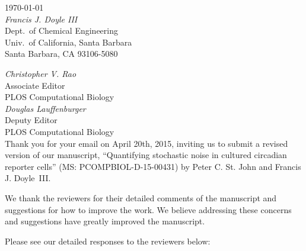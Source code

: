 \documentclass[11pt, letterpaper]{article}
\begin{document}
\begin{flushright}
\today\\[2ex]
{\itshape Francis J. Doyle III}\\
Dept.\ of Chemical Engineering\\
Univ.\ of California, Santa Barbara\\
Santa Barbara, CA 93106-5080\\
\end{flushright}

{\itshape Christopher V. Rao}\\
Associate Editor\\
PLOS Computational Biology\\

{\itshape Douglas Lauffenburger}\\
Deputy Editor\\
PLOS Computational Biology\\

Thank you for your email on April 20th, 2015, inviting us to submit a revised version of our manuscript, ``Quantifying stochastic noise in cultured circadian reporter cells'' (MS: PCOMPBIOL-D-15-00431) by Peter C. St. John and Francis J. Doyle~III.

We thank the reviewers for their detailed comments of the manuscript and suggestions for how to improve the work.
We believe addressing these concerns and suggestions have greatly improved the manuscript.

Please see our detailed responses to the reviewers below: 
\end{document}
